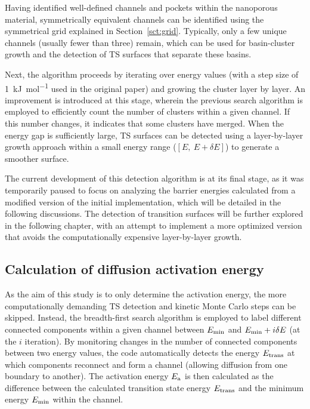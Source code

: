 \documentclass[main]{subfiles}
\begin{document}
Having identified well-defined channels and pockets within the nanoporous material, symmetrically equivalent channels can be identified using the symmetrical grid explained in Section~\ref{sct:grid}. Typically, only a few unique channels (usually fewer than three) remain, which can be used for basin-cluster growth and the detection of TS surfaces that separate these basins.

Next, the algorithm proceeds by iterating over energy values (with a step size of \SI{1}{\kJ\per\mole} used in the original paper) and growing the cluster layer by layer. An improvement is introduced at this stage, wherein the previous search algorithm is employed to efficiently count the number of clusters within a given channel. If this number changes, it indicates that some clusters have merged. When the energy gap is sufficiently large, TS surfaces can be detected using a layer-by-layer growth approach within a small energy range ($[E,\ E+\delta E]$) to generate a smoother surface.

The current development of this detection algorithm is at its final stage, as it was temporarily paused to focus on analyzing the barrier energies calculated from a modified version of the initial implementation, which will be detailed in the following discussions. The detection of transition surfaces will be further explored in the following chapter, with an attempt to implement a more optimized version that avoids the computationally expensive layer-by-layer growth.

\subsection{Calculation of diffusion activation energy}

As the aim of this study is to only determine the activation energy, the more computationally demanding TS detection and kinetic Monte Carlo steps can be skipped. Instead, the breadth-first search algorithm is employed to label different connected components within a given channel between $E_{\text{min}}$ and $E_{\text{min}}+i\delta E$ (at the $i$ iteration). By monitoring changes in the number of connected components between two energy values, the code automatically detects the energy $E_{\text{trans}}$ at which components reconnect and form a channel (allowing diffusion from one boundary to another). The activation energy $E_{\text{a}}$ is then calculated as the difference between the calculated transition state energy $E_{\text{trans}}$ and the minimum energy $E_{\text{min}}$ within the channel.
\end{document}
